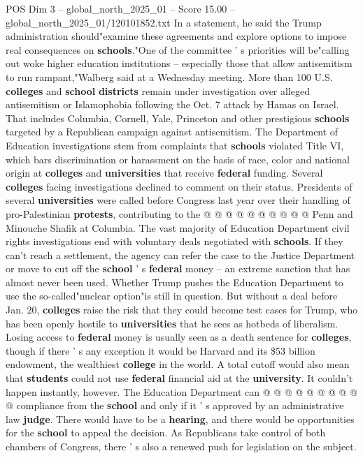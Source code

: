 \begin{textsample}{POS Dim 3 – global\_north\_2025\_01 – Score 15.00 – global\_north\_2025\_01/120101852.txt}
In a statement, he said the Trump administration should"examine these agreements and explore options to impose real consequences on \textbf{schools}."One of the committee ' s priorities will be"calling out woke higher education institutions -- especially those that allow antisemitism to run rampant,"Walberg said at a Wednesday meeting.
More than 100 U.S. \textbf{colleges} and \textbf{school} \textbf{districts} remain under investigation over alleged antisemitism or Islamophobia following the Oct. 7 attack by Hamas on Israel.
That includes Columbia, Cornell, Yale, Princeton and other prestigious \textbf{schools} targeted by a Republican campaign against antisemitism.
The Department of Education investigations stem from complaints that \textbf{schools} violated Title VI, which bars discrimination or harassment on the basis of race, color and national origin at \textbf{colleges} and \textbf{universities} that receive \textbf{federal} funding.
Several \textbf{colleges} facing investigations declined to comment on their status.
Presidents of several \textbf{universities} were called before Congress last year over their handling of pro-Palestinian \textbf{protests}, contributing to the @ @ @ @ @ @ @ @ @ @ Penn and Minouche Shafik at Columbia.
The vast majority of Education Department civil rights investigations end with voluntary deals negotiated with \textbf{schools}.
If they can't reach a settlement, the agency can refer the case to the Justice Department or move to cut off the \textbf{school} ' s \textbf{federal} money -- an extreme sanction that has almost never been used.
Whether Trump pushes the Education Department to use the so-called"nuclear option"is still in question.
But without a deal before Jan. 20, \textbf{colleges} raise the risk that they could become test cases for Trump, who has been openly hostile to \textbf{universities} that he sees as hotbeds of liberalism.
Losing access to \textbf{federal} money is usually seen as a death sentence for \textbf{colleges}, though if there ' s any exception it would be Harvard and its \$53 billion endowment, the wealthiest \textbf{college} in the world.
A total cutoff would also mean that \textbf{students} could not use \textbf{federal} financial aid at the \textbf{university}.
It couldn't happen instantly, however.
The Education Department can @ @ @ @ @ @ @ @ @ @ compliance from the \textbf{school} and only if it ' s approved by an administrative law \textbf{judge}.
There would have to be a \textbf{hearing}, and there would be opportunities for the \textbf{school} to appeal the decision.
As Republicans take control of both chambers of Congress, there ' s also a renewed push for legislation on the subject.

\end{textsample}
